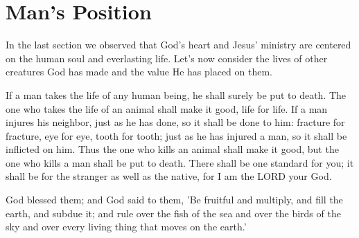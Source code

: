 \vspace{2\baselineskip}

\newpage
\section{Man's Position}
\begin{fullwidth}
In the last section we observed that God's heart and Jesus' ministry are 
centered on the human soul and everlasting life. Let's now consider the lives 
of other creatures God has made and the value He has placed on them.
\end{fullwidth}

\vspace{2\baselineskip}

\begin{scripture}[Leviticus 24:17-22]
     If a man takes the life of any human being, he shall surely be put to death.
        The one who takes the life of an animal shall make it good, life for life.
        If a man injures his neighbor, just as he has done, so it shall be done to him:
        fracture for fracture, eye for eye, tooth for tooth; just as he has injured a man, so it shall be inflicted on him.
        Thus the one who kills an animal shall make it good, but the one who kills a man shall be put to death.
        There shall be one standard for you; it shall be for the stranger as well as the native, for I am the LORD your God.
\end{scripture}

\vspace{3\baselineskip}

\begin{scripture}[Gen 1:28]
    God blessed them; and God said to them, 'Be fruitful and multiply, and fill the earth, and subdue it; and rule over the fish of the sea and over the birds of the sky and over every living thing that moves on the earth.'
\end{scripture}

\vspace{8\baselineskip}

